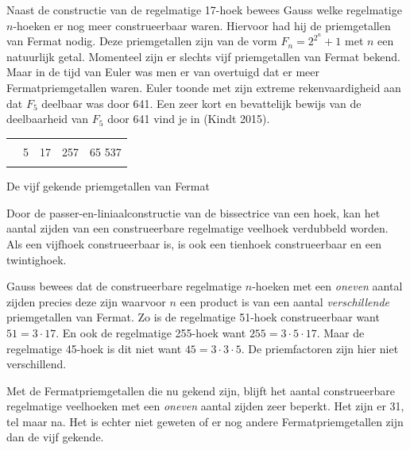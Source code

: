 \begin{multicols}{2}
	
	Naast de constructie van de regelmatige 17-hoek bewees Gauss welke regelmatige $n$-hoeken er nog meer construeerbaar waren. Hiervoor had hij de priemgetallen van Fermat nodig. Deze priemgetallen zijn van de vorm $F_n=2^{2^n}+1$ met $n$ een natuurlijk getal. Momenteel zijn er slechts vijf priemgetallen van Fermat bekend. Maar in de tijd van Euler was men er van overtuigd dat er meer Fermatpriemgetallen waren. Euler toonde met zijn extreme rekenvaardigheid aan dat $F_5$ deelbaar was door 641. Een zeer kort en bevattelijk bewijs van de deelbaarheid van $F_5$ door 641 vind je in (Kindt 2015).
	
	\begin{tabel}
		\begin{tabular}{C{1cm} C{1cm} C{1cm}C{1cm} C{1.5cm}}
			\hlinethick
			 &  &  &  & \\
			 & 5 & 17 & 257 & 65 537\\
			\hlinethick
		\end{tabular}
		\caption{De vijf gekende priemgetallen van Fermat}\label{tab:veer}
	\end{tabel}

 Door de passer-en-liniaalconstructie van de bissectrice van een hoek, kan het aantal zijden van een construeerbare regelmatige veelhoek verdubbeld worden. Als een vijfhoek construeerbaar is, is ook een tienhoek construeerbaar en een twintighoek.
	
	Gauss bewees dat de construeerbare regelmatige $n$-hoeken met een \emph{oneven} aantal zijden precies deze zijn waarvoor $n$ een product is van een aantal \emph{verschillende} priemgetallen van Fermat. Zo is de regelmatige 51-hoek construeerbaar want $51=3\cdot 17$. En ook de regelmatige 255-hoek want $255=3 \cdot 5 \cdot 17$. Maar de regelmatige 45-hoek is dit niet want $45=3 \cdot 3 \cdot 5$. De priemfactoren zijn hier niet verschillend.
	
	 
	
	Met de Fermatpriemgetallen die nu gekend zijn, blijft het aantal construeerbare regelmatige veelhoeken met een \emph{oneven} aantal zijden zeer beperkt. Het zijn er 31, tel maar na.
    Het is echter niet geweten of er nog andere Fermatpriemgetallen zijn dan de vijf gekende.
	

\end{multicols}
